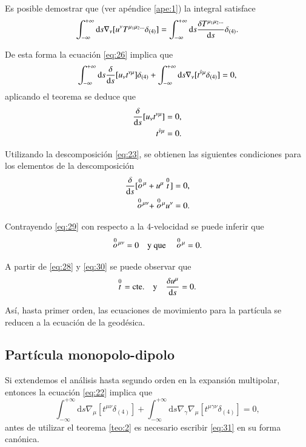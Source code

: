 Es posible demostrar que (ver apéndice \ref{ape:1}) la integral satisface
\begin{equation}
\label{eq:88}
\int_{-\infty}^{+\infty} \mathrm{d}s \nabla_{\nu} [u^{\nu} T^{\mu_1 \mu_2 \dots} \delta_{(4)}] = \int_{-\infty}^{+\infty} \mathrm{d}s \frac{\delta T^{\mu_1 \mu_2 \dots}}{\mathrm{d}s} \delta_{(4)}.
\end{equation}

De esta forma la ecuación \eqref{eq:26} implica que
\begin{equation}
\label{eq:27}
\int_{-\infty}^{+\infty} \mathrm{d}s \frac{\delta }{\mathrm{d}s} [u_{\nu} t^{\nu \mu}] \delta_{(4)} + \int_{-\infty}^{+\infty} \mathrm{d}s \nabla_{\nu} [t^{\hat{\nu} \mu} \delta_{(4)}] = 0,
\end{equation}
aplicando el teorema se deduce que
\begin{align}
\frac{\delta }{\mathrm{d}s} [u_{\nu} t^{\nu \mu}] &= 0,\\
t^{\hat{\nu} \mu} &= 0.
\end{align}

Utilizando la descomposición \eqref{eq:23}, se obtienen las siguientes condiciones para los elementos de la descomposición
\begin{align}
\label{eq:28}
\frac{\delta }{\mathrm{d}s} [\stackrel{0}{o}{\!}^{\mu} + u^{\mu} \stackrel{0}{t}{\!}] &= 0,\\
\label{eq:29}
\stackrel{0}{o}{\!}^{\mu \nu} + \stackrel{0}{o}{\!}^{\mu} u^{\nu} &= 0.
\end{align}

Contrayendo \eqref{eq:29} con respecto a la 4-velocidad se puede inferir que
\begin{equation}
\label{eq:30}
\stackrel{0}{o}{\!}^{\mu \nu} = 0 \quad \mathrm{y \ que} \quad \stackrel{0}{o}{\!}^{\mu} = 0.
\end{equation}

A partir de \eqref{eq:28} y \eqref{eq:30} se puede observar que
\begin{equation}
\stackrel{0}{t}{\!} = \mathrm{cte.} \quad \mathrm{y} \quad \frac{\delta u^{\mu}}{\mathrm{d}s} = 0.
\end{equation}

Así, hasta primer orden, las ecuaciones de movimiento para la partícula se reducen a la ecuación de la geodésica.

\subsection{Partícula monopolo-dipolo}

Si extendemos el análisis hasta segundo orden en la expansión multipolar, entonces la ecuación \eqref{eq:22} implica que
\begin{equation}
\label{eq:31}
\int_{-\infty}^{+\infty} \mathrm{d}s \nabla_{\mu} [ t^{\mu \nu} \delta_{(4)}] + \int_{-\infty}^{+\infty} \mathrm{d}s \nabla_{\gamma}\nabla_{\mu} [ t^{\mu \gamma \nu} \delta_{(4)}] = 0,
\end{equation}
antes de utilizar el teorema \ref{teo:2} es necesario escribir \eqref{eq:31} en su forma canónica.

